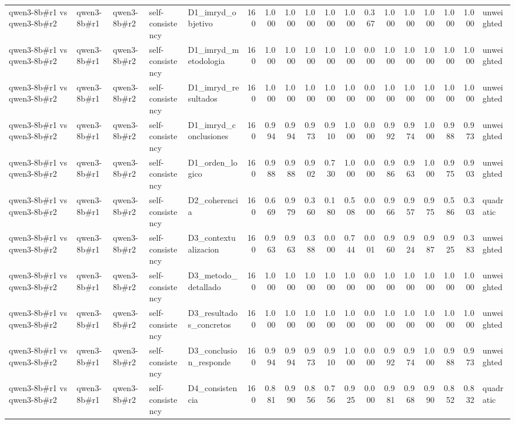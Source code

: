 \begin{table}
{\begin{tabular}{lllllrrrrrrrrrrrrl}
qwen3-8b\#r1 vs qwen3-8b\#r2 & qwen3-8b\#r1 & qwen3-8b\#r2 & self-consistency & D1\_imryd\_objetivo & 160 & 1.000 & 1.000 & 1.000 & 1.000 & 1.000 & 0.367 & 1.000 & 1.000 & 1.000 & 1.000 & 1.000 & unweighted \\
qwen3-8b\#r1 vs qwen3-8b\#r2 & qwen3-8b\#r1 & qwen3-8b\#r2 & self-consistency & D1\_imryd\_metodologia & 160 & 1.000 & 1.000 & 1.000 & 1.000 & 1.000 & 0.000 & 1.000 & 1.000 & 1.000 & 1.000 & 1.000 & unweighted \\
qwen3-8b\#r1 vs qwen3-8b\#r2 & qwen3-8b\#r1 & qwen3-8b\#r2 & self-consistency & D1\_imryd\_resultados & 160 & 1.000 & 1.000 & 1.000 & 1.000 & 1.000 & 0.000 & 1.000 & 1.000 & 1.000 & 1.000 & 1.000 & unweighted \\
qwen3-8b\#r1 vs qwen3-8b\#r2 & qwen3-8b\#r1 & qwen3-8b\#r2 & self-consistency & D1\_imryd\_conclusiones & 160 & 0.994 & 0.994 & 0.973 & 0.910 & 1.000 & 0.000 & 0.992 & 0.974 & 1.000 & 0.988 & 0.973 & unweighted \\
qwen3-8b\#r1 vs qwen3-8b\#r2 & qwen3-8b\#r1 & qwen3-8b\#r2 & self-consistency & D1\_orden\_logico & 160 & 0.988 & 0.988 & 0.902 & 0.730 & 1.000 & 0.000 & 0.986 & 0.963 & 1.000 & 0.975 & 0.903 & unweighted \\
qwen3-8b\#r1 vs qwen3-8b\#r2 & qwen3-8b\#r1 & qwen3-8b\#r2 & self-consistency & D2\_coherencia & 160 & 0.669 & 0.979 & 0.360 & 0.180 & 0.508 & 0.000 & 0.966 & 0.957 & 0.975 & 0.586 & 0.303 & quadratic \\
qwen3-8b\#r1 vs qwen3-8b\#r2 & qwen3-8b\#r1 & qwen3-8b\#r2 & self-consistency & D3\_contextualizacion & 160 & 0.963 & 0.963 & 0.388 & 0.000 & 0.744 & 0.001 & 0.960 & 0.924 & 0.987 & 0.925 & 0.383 & unweighted \\
qwen3-8b\#r1 vs qwen3-8b\#r2 & qwen3-8b\#r1 & qwen3-8b\#r2 & self-consistency & D3\_metodo\_detallado & 160 & 1.000 & 1.000 & 1.000 & 1.000 & 1.000 & 0.000 & 1.000 & 1.000 & 1.000 & 1.000 & 1.000 & unweighted \\
qwen3-8b\#r1 vs qwen3-8b\#r2 & qwen3-8b\#r1 & qwen3-8b\#r2 & self-consistency & D3\_resultados\_concretos & 160 & 1.000 & 1.000 & 1.000 & 1.000 & 1.000 & 0.000 & 1.000 & 1.000 & 1.000 & 1.000 & 1.000 & unweighted \\
qwen3-8b\#r1 vs qwen3-8b\#r2 & qwen3-8b\#r1 & qwen3-8b\#r2 & self-consistency & D3\_conclusion\_responde & 160 & 0.994 & 0.994 & 0.973 & 0.910 & 1.000 & 0.000 & 0.992 & 0.974 & 1.000 & 0.988 & 0.973 & unweighted \\
qwen3-8b\#r1 vs qwen3-8b\#r2 & qwen3-8b\#r1 & qwen3-8b\#r2 & self-consistency & D4\_consistencia & 160 & 0.881 & 0.990 & 0.856 & 0.756 & 0.925 & 0.000 & 0.981 & 0.968 & 0.990 & 0.852 & 0.832 & quadratic \\

\end{tabular}}
\end{table}
